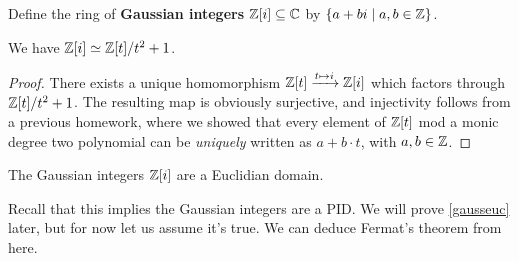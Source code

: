     \begin{definition}[]
        Define the ring of \textbf{Gaussian integers} $\mathbb{Z} [i] \subseteq \mathbb{C}$ by $\{a +bi \mid a,b \in \mathbb{Z}\} $.
    \end{definition}
    \begin{lemma}
        We have $\mathbb{Z} [i] \simeq  \mathbb{Z}[t] / t^2+1$.
    \end{lemma}
    \begin{proof}
        There exists a unique homomorphism $\mathbb{Z}[t] \xrightarrow{t \mapsto i} \mathbb{Z}[i]$ which factors through $\mathbb{Z}[t] / t^2+1$. The resulting map is obviously surjective, and injectivity follows from a previous homework, where we showed that every element of $\mathbb{Z}[t]$ mod a monic degree two polynomial can be \emph{uniquely} written as $a+ b \cdot t$, with $a,b \in \mathbb{Z}$.
    \end{proof}

    \begin{theorem}\label{gausseuc} 
        The Gaussian integers $\mathbb{Z}[i]$ are a Euclidian domain.
    \end{theorem}
    Recall that this implies the Gaussian integers are a PID. We will prove \cref{gausseuc} later, but for now let us assume it's true. We can deduce Fermat's theorem from here.

